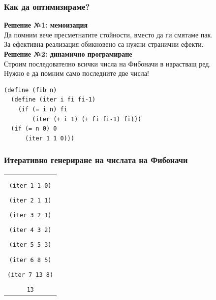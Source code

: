 \documentclass{beamer}
\begin{document}
\begin{frame}[fragile]
  \frametitle{Как да оптимизираме?}

  \textbf{Решение №1: мемоизация}\\
  Да помним вече пресметнатите стойности, вместо да ги смятаме пак.\\
  \pause
  \alert{За ефективна реализация обикновено са нужни странични ефекти.}\\[1em]
  \pause
  \textbf{Решение №2: динамично програмиране}\\
  Строим последователно всички числа на Фибоначи в нарастващ ред.\\
  \pause
  \alert{Нужно е да помним само последните две числа!}\\
  \pause
\begin{lstlisting}
(define (fib n)
  (define (iter i fi fi-1)
    (if (= i n) fi
        (iter (+ i 1) (+ fi fi-1) fi)))
  (if (= n 0) 0
      (iter 1 1 0)))
\end{lstlisting}
\end{frame}

\begin{frame}
  \frametitle{Итеративно генериране на числата на Фибоначи}

  \small
  \begin{center}
    \begin{tabular}{c}
      \nxt{\tt{(fib 7)}\\
      \nxt{\bda\\
      \tt{(iter 1 1 0)}\\
      \nxt{\bda\\
      \tt{(iter 2 1 1)}\\
      \nxt{\bda\\
      \tt{(iter 3 2 1)}\\
      \nxt{\bda\\
      \tt{(iter 4 3 2)}\\
      \nxt{\bda\\
      \tt{(iter 5 5 3)}\\
      \nxt{\bda\\
      \tt{(iter 6 8 5)}\\
      \nxt{\bda\\
      \tt{(iter 7 13 8)}\\
      \nxt{\bda\\
      \tt{13}}}}}}}}}}
    \end{tabular}
  \end{center}
\end{frame}
\end{document}
